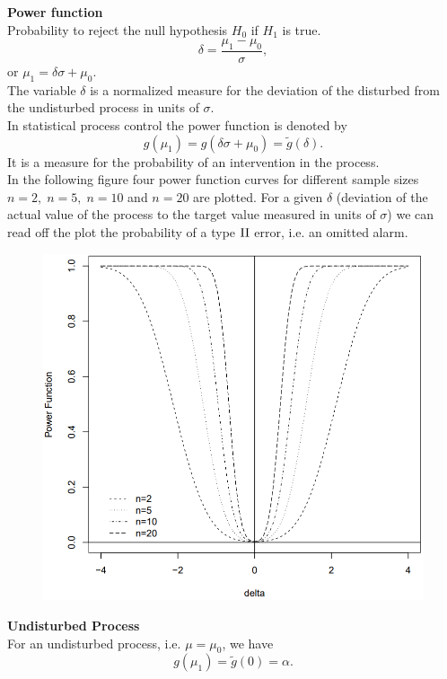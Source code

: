 \textbf{Power function}\\
Probability to reject the null hypothesis $H_0$ if $H_1$ is true.\\
\begin{equation}
  \delta = \frac{\mu_1 - \mu_0}{\sigma},
\end{equation}
or $\mu_1 = \delta\sigma + \mu_0$.\\
The variable $\delta$ is a normalized measure for the deviation of the disturbed from the undisturbed process in units of $\sigma$.\\
In statistical process control the power function is denoted by
\begin{equation}
  g(\mu_1) = g(\delta\sigma + \mu_0) = \tilde{g} (\delta).
\end{equation}
It is a measure for the probability of an intervention in the process.\\

In the following figure four power function curves for different sample sizes $n=2,\; n=5,\; n=10$ and $n=20$ are plotted.
For a given $\delta$ (deviation of the actual value of the process to the target value measured in units of $\sigma$) we can read off the plot the probability of a type $\textup{II}$ error, i.e. an omitted alarm.
\begin{figure}[H]
  \centering
  \includegraphics[width=0.8\linewidth]{Pics/3.3.2.png}
\end{figure}

\textbf{Undisturbed Process}\\
For an undisturbed process, i.e. $\mu = \mu_0$, we have
\begin{equation}
  g(\mu_1) = \tilde{g} (0) = \alpha.
  \label{eq:3.3.a}
\end{equation}

